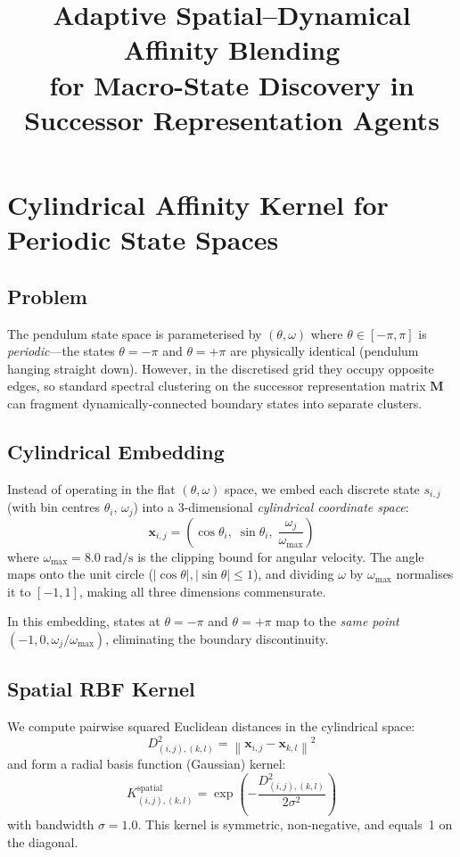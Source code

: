\documentclass[11pt,a4paper]{article}
\title{Adaptive Spatial--Dynamical Affinity Blending\\for Macro-State Discovery in\\Successor Representation Agents}
\author{}
\date{}
\begin{document}
\maketitle

\section{Cylindrical Affinity Kernel for Periodic State Spaces}

\subsection{Problem}

The pendulum state space is parameterised by $(\theta, \omega)$ where
$\theta \in [-\pi, \pi]$ is \emph{periodic}---the states $\theta = -\pi$
and $\theta = +\pi$ are physically identical (pendulum hanging straight
down).  However, in the discretised grid they occupy opposite edges, so
standard spectral clustering on the successor representation matrix
$\mathbf{M}$ can fragment dynamically-connected boundary states into
separate clusters.

\subsection{Cylindrical Embedding}

Instead of operating in the flat $(\theta, \omega)$ space, we embed each
discrete state $s_{i,j}$ (with bin centres $\theta_i$, $\omega_j$) into
a 3-dimensional \emph{cylindrical coordinate space}:
\begin{equation}
\mathbf{x}_{i,j} = \left(\cos\theta_i,\;\sin\theta_i,\;\frac{\omega_j}{\omega_{\max}}\right)
\end{equation}
where $\omega_{\max} = 8.0\;\text{rad/s}$ is the clipping bound for
angular velocity.  The angle maps onto the unit circle
($|\cos\theta|, |\sin\theta| \leq 1$), and dividing $\omega$ by
$\omega_{\max}$ normalises it to $[-1, 1]$, making all three dimensions
commensurate.

In this embedding, states at $\theta = -\pi$ and $\theta = +\pi$ map to
the \emph{same point} $(-1, 0, \omega_j/\omega_{\max})$, eliminating the
boundary discontinuity.

\subsection{Spatial RBF Kernel}

We compute pairwise squared Euclidean distances in the cylindrical space:
\begin{equation}
D^2_{(i,j),(k,l)} = \left\|\mathbf{x}_{i,j} - \mathbf{x}_{k,l}\right\|^2
\end{equation}
and form a radial basis function (Gaussian) kernel:
\begin{equation}
K^{\text{spatial}}_{(i,j),(k,l)} = \exp\!\left(-\frac{D^2_{(i,j),(k,l)}}{2\sigma^2}\right)
\end{equation}
with bandwidth $\sigma = 1.0$.  This kernel is symmetric, non-negative,
and equals~1 on the diagonal.
\end{document}
